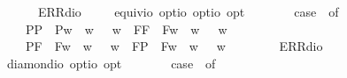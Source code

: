 \begin{isabellebody}
\ \ \ \ {\isacharunderscore}\ {\isasymRightarrow}\ ERR{\isacharparenleft}dio{\isacharparenright}{\isachardoublequoteclose}\ \ \isanewline
\isanewline
\ \isamarkupfalse%
\ equiv{\isacharcolon}{\isacharcolon}{\isachardoublequoteopen}io\ opt{\isasymRightarrow}io\ opt{\isasymRightarrow}io\ opt{\isachardoublequoteclose}\ {\isacharparenleft}\ {\isachardoublequoteopen}\isactrlbold {\isasymequiv}{\isachardoublequoteclose}\ {}{}{\isacharparenright}\ \ {\isachardoublequoteopen}{\isasymphi}\ \isactrlbold {\isasymequiv}\ {\isasympsi}{\isasymequiv}\ case\ {\isacharparenleft}{\isasymphi}{\isacharcomma}{\isasympsi}{\isacharparenright}\ of\isanewline
\ \ \ \ {\isacharparenleft}P{\isacharparenleft}{\isasymalpha}{\isacharparenright}{\isacharcomma}P{\isacharparenleft}{\isasymbeta}{\isacharparenright}{\isacharparenright}\ {\isasymRightarrow}\ P{\isacharparenleft}{\isasymlambda}w{\isachardot}\ {\isasymalpha}\ w\ {\isasymlongleftrightarrow}\ {\isasymbeta}\ w{\isacharparenright}\ {\isacharbar}\ {\isacharparenleft}F{\isacharparenleft}{\isasymalpha}{\isacharparenright}{\isacharcomma}F{\isacharparenleft}{\isasymbeta}{\isacharparenright}{\isacharparenright}\ {\isasymRightarrow}\ F{\isacharparenleft}{\isasymlambda}w{\isachardot}\ {\isasymalpha}\ w\ {\isasymlongleftrightarrow}\ {\isasymbeta}\ w{\isacharparenright}\ {\isacharbar}\ \isanewline
\ \ \ \ {\isacharparenleft}P{\isacharparenleft}{\isasymalpha}{\isacharparenright}{\isacharcomma}F{\isacharparenleft}{\isasymbeta}{\isacharparenright}{\isacharparenright}\ {\isasymRightarrow}\ F{\isacharparenleft}{\isasymlambda}w{\isachardot}\ {\isasymalpha}\ w\ {\isasymlongleftrightarrow}\ {\isasymbeta}\ w{\isacharparenright}\ {\isacharbar}\ {\isacharparenleft}F{\isacharparenleft}{\isasymalpha}{\isacharparenright}{\isacharcomma}P{\isacharparenleft}{\isasymbeta}{\isacharparenright}{\isacharparenright}\ {\isasymRightarrow}\ F{\isacharparenleft}{\isasymlambda}w{\isachardot}\ {\isasymalpha}\ w\ {\isasymlongleftrightarrow}\ {\isasymbeta}\ w{\isacharparenright}\ {\isacharbar}\ \isanewline
\ \ \ \ {\isacharunderscore}\ {\isasymRightarrow}\ ERR{\isacharparenleft}dio{\isacharparenright}{\isachardoublequoteclose}\ \ \isanewline
\isanewline
\ \isamarkupfalse%
\ diamond{\isacharcolon}{\isacharcolon}{\isachardoublequoteopen}io\ opt{\isasymRightarrow}io\ opt{\isachardoublequoteclose}\ {\isacharparenleft}{\isachardoublequoteopen}\isactrlbold {\isasymdiamond}\ {\isacharunderscore}{\isachardoublequoteclose}\ {\isacharbrackleft}{}{}{\isacharbrackright}\ {}{}{\isacharparenright}\ \ {\isachardoublequoteopen}\isactrlbold {\isasymdiamond}{\isasymphi}\ {\isasymequiv}\ case\ {\isasymphi}\ of\ \isanewline

\end{isabellebody}
